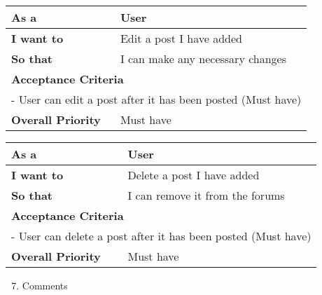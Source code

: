 \begin{table}[h!]
    \begin{tabular}{|ll|}
    \hline
    \multicolumn{1}{|l|}{\textbf{As a}}             & User                             \\ \hline
    \multicolumn{1}{|l|}{\textbf{I want to}}        & Edit a post I have added         \\ \hline
    \multicolumn{1}{|l|}{\textbf{So that}}          & I can make any necessary changes \\ \hline
    \multicolumn{2}{|l|}{\textbf{Acceptance Criteria}}                                 \\ \hline
    \multicolumn{2}{|l|}{- User can edit a post after it has been posted (Must have)}  \\ \hline
    \multicolumn{1}{|l|}{\textbf{Overall Priority}} & Must have                        \\ \hline
    \end{tabular}
\end{table}

\begin{table}[h!]
    \begin{tabular}{|ll|}
    \hline
    \multicolumn{1}{|l|}{\textbf{As a}}              & User                             \\ \hline
    \multicolumn{1}{|l|}{\textbf{I want to}}         & Delete a post I have added       \\ \hline
    \multicolumn{1}{|l|}{\textbf{So that}}           & I can remove it from the forums  \\ \hline
    \multicolumn{2}{|l|}{\textbf{Acceptance Criteria}}                                  \\ \hline
    \multicolumn{2}{|l|}{- User can delete a post after it has been posted (Must have)} \\ \hline
    \multicolumn{1}{|l|}{\textbf{Overall Priority}}  & Must have                        \\ \hline
    \end{tabular}
\end{table}

\begin{enumerate}
    \setcounter{enumi}{6}
    \item Comments
\end{enumerate}

